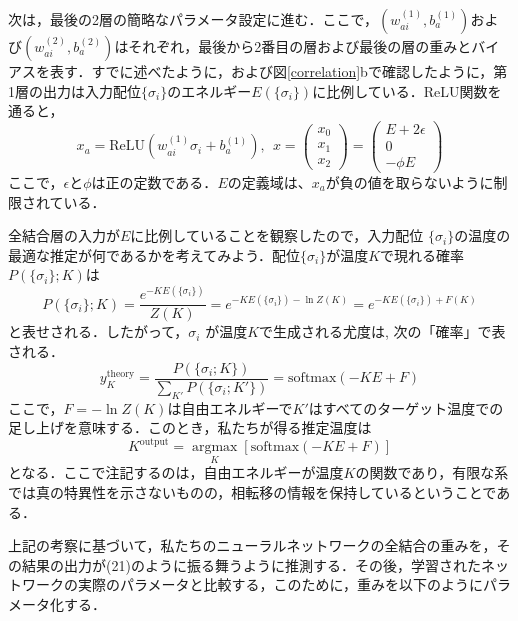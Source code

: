 \documentclass[a4paper,11pt]{jsarticle}
\begin{document}
次は，最後の2層の簡略なパラメータ設定に進む．ここで，$(w_{ai}^{(1)}, b_a^{(1)})$および$(w_{ai}^{(2)}, b_a^{(2)})$はそれぞれ，最後から2番目の層および最後の層の重みとバイアスを表す．すでに述べたように，および図\ref{correlation}bで確認したように，第1層の出力は入力配位$\{ \sigma_i \}$のエネルギー$E(\{ \sigma_i \})$に比例している．ReLU関数を通ると，
\begin{equation}
  x_a = \text{ReLU}(w_{ai}^{(1)}\sigma_i + b_a^{(1)}), \ \
  x = \begin{pmatrix} x_0 \\ x_1 \\ x_2 \end{pmatrix}
  = \begin{pmatrix} E+2\epsilon \\ 0 \\ -\phi E \end{pmatrix}
\end{equation}
ここで，$\epsilon$と$\phi$は正の定数である．$E$の定義域は、$x_a$が負の値を取らないように制限されている．\par
全結合層の入力が$E$に比例していることを観察したので，入力配位 $\{\sigma_i\}$の温度の最適な推定が何であるかを考えてみよう．配位$\{ \sigma_i \}$が温度$K$で現れる確率$P(\{ \sigma_i \} ; K )$は
\begin{equation}
  P(\{ \sigma_i \} ; K )
  = \frac{e^{-KE(\{ \sigma_i \})}}{Z(K)}
  = e^{-KE(\{ \sigma_i \}) - \ln{Z(K)}}
  = e^{-KE(\{ \sigma_i \}) + F(K)}
\end{equation}
と表せされる．したがって，${\sigma_i}$ が温度$K$で生成される尤度は,
次の「確率」で表される．
\begin{equation}
  y_K^{\text{theory}} = \frac{P(\{\sigma_i ; K \})}{\sum_{K'}P(\{\sigma_i ; K' \})} = \text{softmax}(-KE + F)
\end{equation}
ここで，$F = -\ln{Z(K)}$は自由エネルギーで$K'$はすべてのターゲット温度での足し上げを意味する．このとき，私たちが得る推定温度は
\begin{equation}
  K^{\text{output}} =
  \underset{K} {\operatorname{argmax}} \left[\text{softmax}(-KE + F)\right]
\end{equation}
となる．ここで注記するのは，自由エネルギーが温度$K$の関数であり，有限な系では真の特異性を示さないものの，相転移の情報を保持しているということである．\par
上記の考察に基づいて，私たちのニューラルネットワークの全結合の重みを，その結果の出力が(21)のように振る舞うように推測する．その後，学習されたネットワークの実際のパラメータと比較する，このために，重みを以下のようにパラメータ化する．
\end{document}
